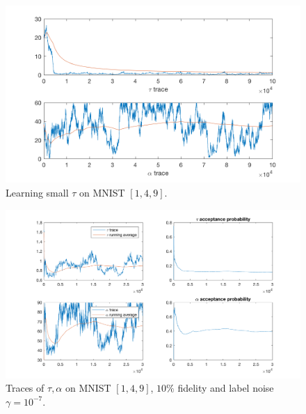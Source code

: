 \documentclass{siamart1116}
\begin{document}
        \begin{figure}[!htb]
        \centering
        \caption{\label{ta_mnist_1}Learning small $\tau$ on MNIST $[1, 4, 9]$.}
        \includegraphics[width=0.8\linewidth]{choose_hyp/t_a/learn_tau.png}
        \end{figure}

        \begin{figure}[!htb]
        \centering
        \caption{\label{ta_mnist_3}Traces of $\tau, \alpha$ on MNIST $[1, 4, 9]$, $10\%$ fidelity and label noise $\gamma = 10^{-7}$.}
        \includegraphics[width=0.8\linewidth]{choose_hyp/t_a/ten_fidelity.png}
        \end{figure}
\end{document}
